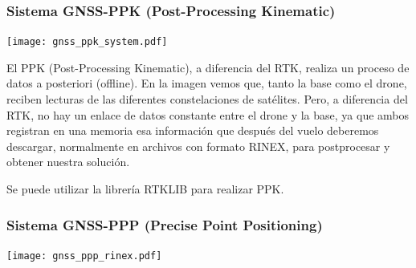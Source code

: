 \begin{frame}
    \frametitle{Sistema GNSS-PPK (Post-Processing Kinematic)}
    \begin{center}
        \texttt{[image: gnss\_ppk\_system.pdf]}
    \end{center}


    El PPK (Post-Processing Kinematic), a diferencia del RTK, realiza un proceso de datos a posteriori (offline).
    En la imagen vemos que, tanto la base como el drone, reciben lecturas de las diferentes constelaciones de satélites. 
    Pero, a diferencia del RTK, no hay un enlace de datos constante entre el drone y la base, ya que ambos registran en una memoria esa información que después del vuelo deberemos descargar, normalmente en archivos con formato RINEX, para postprocesar y obtener nuestra solución.

    Se puede utilizar la librería RTKLIB para realizar PPK.
    
\end{frame}

\begin{frame}
    \frametitle{Sistema GNSS-PPP (Precise Point Positioning)}
    \begin{center}
        \texttt{[image: gnss\_ppp\_rinex.pdf]}
    \end{center}

\end{frame}